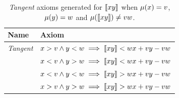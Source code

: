 \begin{table}[ht]
	\centering
	\setlength{\tabcolsep}{1.2em}
	\renewcommand{\arraystretch}{1.3}
	\begin{tabular}{@{}ll@{}}
		\hline
		\textbf{Name}    & \textbf{Axiom}                                        \\
		\hline
		\textit{Tangent} & $x > v \land y < w \implies \llbracket xy \rrbracket < wx + vy - vw$ \\
		                 & $x < v \land y > w \implies \llbracket xy \rrbracket < wx + vy - vw$ \\
		                 & $x < v \land y < w \implies \llbracket xy \rrbracket > wx + vy - vw$ \\
		                 & $x > v \land y > w \implies \llbracket xy \rrbracket > wx + vy - vw$ \\
		\hline
	\end{tabular}
	\vspace{0.9em}
	\caption{%
		\textit{Tangent} axioms generated for $\llbracket xy \rrbracket$ when $\mu(x)=v$, $\mu(y)=w$ and $\mu(\llbracket xy \rrbracket)\neq vw$.\label{tab:mul-tangent-axioms}}
\end{table}
